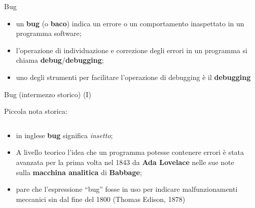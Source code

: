 
\begin{frame}{Bug}

  \begin{itemize}
   \item un \textbf{bug} (o \textbf{baco}) indica un errore o un comportamento inaspettato
   in un programma software;
   \item l'operazione di individuazione e correzione degli errori in un programma si chiama
   \textbf{debug}/\textbf{debugging};
   \item uno degli strumenti per facilitare l'operazione di debugging è il \textbf{debugging}
  \end{itemize}

\end{frame}

\begin{frame}{Bug (intermezzo storico) (I)}

  Piccola nota storica:
    \begin{columns}[T]
      \begin{column}{8cm}
	\begin{itemize}
	  \item in inglese \textbf{bug} significa \emph{insetto};
	  \item A livello teorico l'idea che un programma potesse contenere errori \`e stata avanzata
	  per la prima volta nel 1843 da \textbf{Ada Lovelace} nelle sue note sulla \textbf{macchina analitica} di \textbf{Babbage};
	  \item pare che l'espressione ``bug'' fosse in uso per indicare malfunzionamenti meccanici sin dal fine del 1800
	  (Thomas Edison, 1878)
	\end{itemize}

    \end{column}

    \begin{column}[T]{4cm}
	\begin{center}
	\end{center}
    \end{column}
  \end{columns}


\end{frame}

